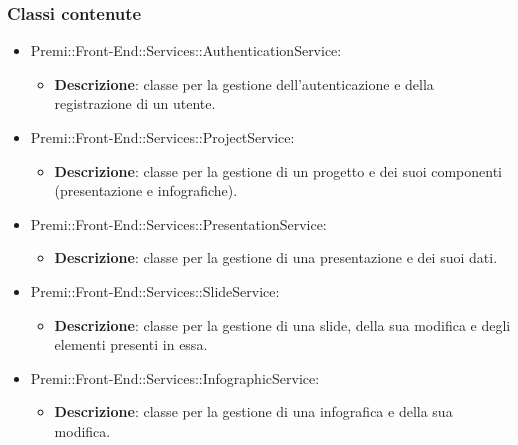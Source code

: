 \subsubsection*{Classi contenute}
\begin{itemize}

    \item Premi::Front-End::Services::AuthenticationService:
	\begin{itemize}
		\item \textbf{Descrizione}: classe per la gestione dell'autenticazione e della registrazione di un utente.
	\end{itemize}

    \item Premi::Front-End::Services::ProjectService:
	\begin{itemize}
		\item \textbf{Descrizione}: classe per la gestione di un progetto e dei suoi componenti (presentazione e infografiche).
	\end{itemize}

    \item Premi::Front-End::Services::PresentationService:
	\begin{itemize}
		\item \textbf{Descrizione}: classe per la gestione di una presentazione e dei suoi dati.
	\end{itemize}

    \item Premi::Front-End::Services::SlideService:
	\begin{itemize}
		\item \textbf{Descrizione}: classe per la gestione di una slide, della sua modifica e degli elementi presenti in essa.
	\end{itemize}

    \item Premi::Front-End::Services::InfographicService:
	\begin{itemize}
		\item \textbf{Descrizione}: classe per la gestione di una infografica e della sua modifica.
	\end{itemize}

\end{itemize}
